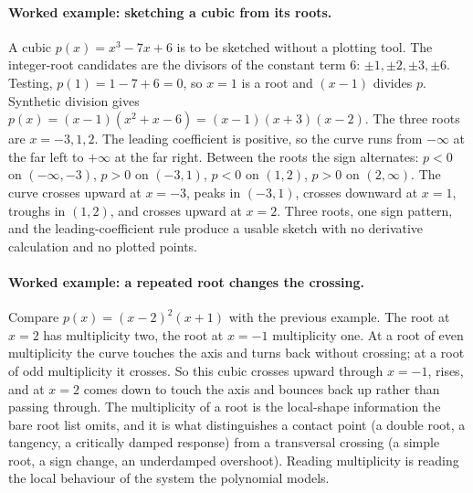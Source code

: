 \paragraph{Worked example: sketching a cubic from its roots.}
A cubic $p(x) = x^{3} - 7x + 6$ is to be sketched without a plotting
tool. The integer-root candidates are the divisors of the constant
term $6$: $\pm 1, \pm 2, \pm 3, \pm 6$. Testing, $p(1) = 1 - 7 + 6 =
0$, so $x = 1$ is a root and $(x - 1)$ divides $p$. Synthetic
division gives $p(x) = (x - 1)(x^{2} + x - 6) = (x - 1)(x + 3)
(x - 2)$. The three roots are $x = -3, 1, 2$. The leading coefficient
is positive, so the curve runs from $-\infty$ at the far left to
$+\infty$ at the far right. Between the roots the sign alternates: $p
< 0$ on $(-\infty, -3)$, $p > 0$ on $(-3, 1)$, $p < 0$ on $(1, 2)$,
$p > 0$ on $(2, \infty)$. The curve crosses upward at $x = -3$, peaks
in $(-3, 1)$, crosses downward at $x = 1$, troughs in $(1, 2)$, and
crosses upward at $x = 2$. Three roots, one sign pattern, and the
leading-coefficient rule produce a usable sketch with no derivative
calculation and no plotted points.

\paragraph{Worked example: a repeated root changes the crossing.}
Compare $p(x) = (x - 2)^{2}(x + 1)$ with the previous example. The
root at $x = 2$ has multiplicity two, the root at $x = -1$
multiplicity one. At a root of even multiplicity the curve touches
the axis and turns back without crossing; at a root of odd
multiplicity it crosses. So this cubic crosses upward through
$x = -1$, rises, and at $x = 2$ comes down to touch the axis and
bounces back up rather than passing through. The multiplicity of a
root is the local-shape information the bare root list omits, and it
is what distinguishes a contact point (a double root, a tangency, a
critically damped response) from a transversal crossing (a simple
root, a sign change, an underdamped overshoot). Reading multiplicity
is reading the local behaviour of the system the polynomial models.

